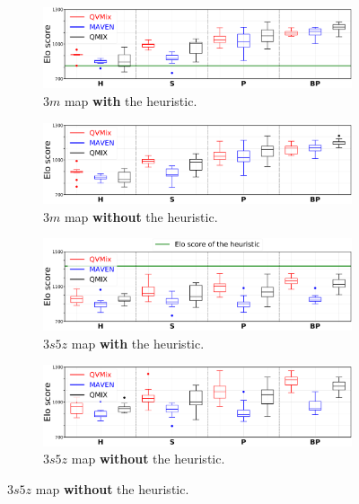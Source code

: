 \begin{figure}[ht]
\begin{subfigure}{\textwidth}
\centering
\includegraphics[width=.9\textwidth]{figures/ch7/3m_tiny_all_h_clean.pdf}
\caption{$3m$ map \textbf{with} the heuristic.}
\label{subfig:3m_all_h}
\end{subfigure}
\begin{subfigure}{\textwidth}
\centering
\includegraphics[width=.9\textwidth]{figures/ch7/3m_tiny_all_no_h_clean.pdf}
\caption{$3m$ map \textbf{without} the heuristic.}
\label{subfig:3m_all_no_h}
\end{subfigure}
\begin{subfigure}{\textwidth}
\centering
\includegraphics[width=.9\textwidth]{figures/ch7/3s5z_tiny_all_h_clean.pdf}
\caption{$3s5z$ map \textbf{with} the heuristic.}
\label{subfig:3s5z_all_h}
\end{subfigure}
\begin{subfigure}{\textwidth}
\centering
\includegraphics[width=.9\textwidth]{figures/ch7/3s5z_tiny_all_no_h_clean.pdf}
\caption{$3s5z$ map \textbf{without} the heuristic.}
\label{subfig:3s5z_all_no_h}

\end{subfigure}
\end{figure}
